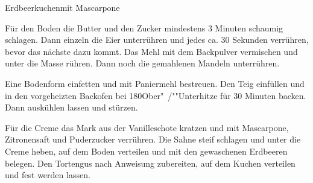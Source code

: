 \begin{recipe}{Erdbeerkuchen}{mit Mascarpone}\label{Erdbeerkuchen}



  \steps

  Für den Boden die Butter und den Zucker mindestens 3 Minuten schaumig
  schlagen. Dann einzeln die Eier unterrühren und jedes ca. 30 Sekunden
  verrühren, bevor das nächste dazu kommt. Das Mehl mit dem Backpulver
  vermischen und unter die Masse rühren. Dann noch die gemahlenen Mandeln
  unterrühren.

  Eine Bodenform einfetten und mit Paniermehl bestreuen. Den Teig einfüllen und
  in den vorgeheizten Backofen bei 180\celsius Ober"~/""Unterhitze für 30 Minuten
  backen. Dann auskühlen lassen und stürzen.

  Für die Creme das Mark aus der Vanilleschote kratzen und mit Mascarpone,
  Zitronensaft und Puderzucker verrühren. Die Sahne steif schlagen und unter
  die Creme heben, auf dem Boden verteilen und mit den gewaschenen Erdbeeren
  belegen. Den Tortengus nach Anweisung zubereiten, auf dem Kuchen verteilen
  und fest werden lassen.

\end{recipe}
